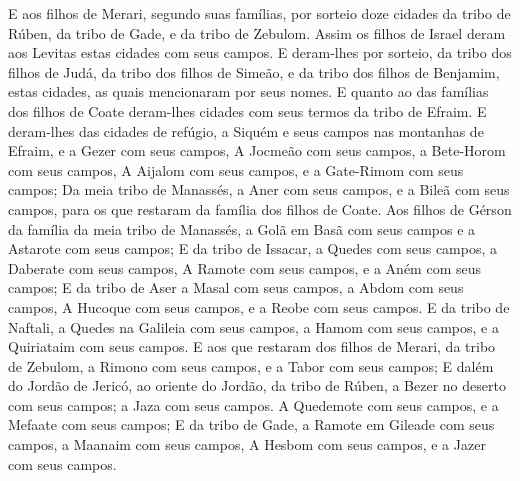 {  E aos filhos de Merari, segundo suas famílias, {} por sorteio doze cidades da tribo de Rúben, da tribo de Gade, e da tribo de Zebulom.
  Assim os filhos de Israel deram aos Levitas estas cidades com seus campos.
  E deram-lhes por sorteio, da tribo dos filhos de Judá, da tribo dos filhos de Simeão, e da tribo dos filhos de Benjamim, estas cidades, as quais mencionaram por seus nomes.
  E quanto ao {} das famílias dos filhos de Coate deram-lhes cidades com seus termos da tribo de Efraim.
  E deram-lhes das cidades de refúgio, a Siquém e seus campos nas montanhas de Efraim, e a Gezer com seus campos,
  A Jocmeão com seus campos, a Bete-Horom com seus campos,
  A Aijalom com seus campos, e a Gate-Rimom com seus campos;
  Da meia tribo de Manassés, a Aner com seus campos, e a Bileã com seus campos, para os que restaram da família dos filhos de Coate.
  Aos filhos de Gérson {} da família da meia tribo de Manassés, a Golã em Basã com seus campos e a Astarote com seus campos;
  E da tribo de Issacar, a Quedes com seus campos, a Daberate com seus campos,
  A Ramote com seus campos, e a Aném com seus campos;
  E da tribo de Aser a Masal com seus campos, a Abdom com seus campos,
  A Hucoque com seus campos, e a Reobe com seus campos.
  E da tribo de Naftali, a Quedes na Galileia com seus campos, a Hamom com seus campos, e a Quiriataim com seus campos.
  E aos que restaram dos filhos de Merari, {} da tribo de Zebulom, a Rimono com seus campos, e a Tabor com seus campos;
  E dalém do Jordão de Jericó, ao oriente do Jordão, {} da tribo de Rúben, a Bezer no deserto com seus campos; a Jaza com seus campos.
  A Quedemote com seus campos, e a Mefaate com seus campos;
  E da tribo de Gade, a Ramote em Gileade com seus campos, a Maanaim com seus campos,
  A Hesbom com seus campos, e a Jazer com seus campos.
\par }


